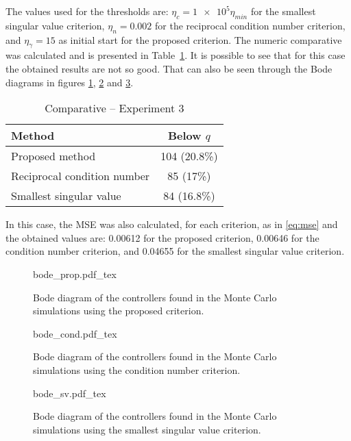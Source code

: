 The values used for the thresholds are: $\eta_c = \num{1e5}\eta_{min} $ for the smallest singular value criterion, $\eta_n = 0.002$ for the reciprocal condition number criterion, and $\eta_\gamma = 15$ as initial start for the proposed criterion.
The numeric comparative was calculated and is presented in Table~\ref{tab:comp_ol_mismatched}.
It is possible to see that for this case the obtained results are not so good.
That can also be seen through the Bode diagrams in figures \ref{fig:bode_prop}, \ref{fig:bode_cond} and \ref{fig:bode_sv}.
\begin{table}[h!]
\caption{Comparative -- Experiment 3 \label{tab:comp_ol_mismatched}}
\centering
\begin{tabular}{lc}
\toprule
Method & Below $q$\\
\midrule
Proposed method & 104 (20.8\%) \\
Reciprocal condition number & 85 (17\%) \\
Smallest singular value & 84 (16.8\%) \\
\bottomrule
\end{tabular}
\end{table}

In this case, the MSE was also calculated, for each criterion, as in \eqref{eq:mse} and the obtained values are: 0.00612 for the proposed criterion, 0.00646 for the condition number criterion, and 0.04655 for the smallest singular value criterion.


\begin{figure}[h!]
  \centering
  \def\svgwidth{\columnwidth}
  {\footnotesize{bode_prop.pdf_tex}}
  \caption{\label{fig:bode_prop} Bode diagram of the controllers found in the Monte Carlo simulations using the proposed criterion.}
\end{figure}

\begin{figure}[h!]
  \centering
  \def\svgwidth{\columnwidth}
  {\footnotesize{bode_cond.pdf_tex}}
  \caption{\label{fig:bode_cond} Bode diagram of the controllers found in the Monte Carlo simulations using the condition number criterion.}
\end{figure}

\begin{figure}[h!]
  \centering
  \def\svgwidth{\columnwidth}
  {\footnotesize{bode_sv.pdf_tex}}
  \caption{\label{fig:bode_sv} Bode diagram of the controllers found in the Monte Carlo simulations using the smallest singular value criterion.}
\end{figure}




